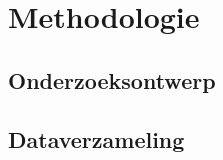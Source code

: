 \chapter{Methodologie}
\label{hoofdstuk:methodologie}
\section{Onderzoeksontwerp}

\section{Dataverzameling}